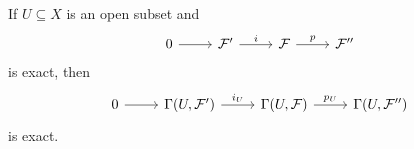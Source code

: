 If $U \subseteq X$ is an open subset and
\[\begin{tikzcd}
	0 \arrow[r] & \mathcal{F}' \arrow[r, "i"] & \mathcal{F} \arrow[r, "p"] & \mathcal{F}''
\end{tikzcd}\]
is exact, then
\[\begin{tikzcd}
	0 \arrow[r] & \Gamma(U, \mathcal{F}') \arrow[r, "i_U"] & \Gamma(U, \mathcal{F}) \arrow[r, "p_U"] & \Gamma(U, \mathcal{F}'')
\end{tikzcd}\]
is exact.
